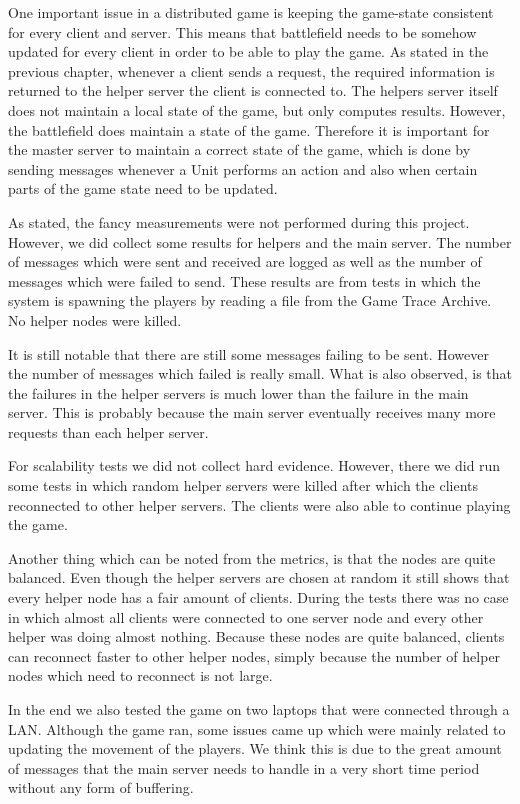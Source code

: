 One important issue in a distributed game is keeping the game-state consistent for every client and server.
This means that battlefield needs to be somehow updated for every client in order to be able to play the game.
As stated in the previous chapter, whenever a client sends a request, the required information is returned to the helper server the client is connected to.
The helpers server itself does not maintain a local state of the game, but only computes results.
However, the battlefield does maintain a state of the game. 
Therefore it is important for the master server to maintain a correct state of the game, which is done by sending messages whenever a Unit performs an action and also when certain parts of the game state need to be updated.

As stated, the fancy measurements were not performed during this project. 
However, we did collect some results for helpers and the main server.
The number of messages which were sent and received are logged as well as the number of messages which were failed to send.
These results are from tests in which the system is spawning the players by reading a file from the Game Trace Archive.
No helper nodes were killed.

It is still notable that there are still some messages failing to be sent. However the number of messages which failed is really small.
What is also observed, is that the failures in the helper servers is much lower than the failure in the main server.
This is probably because the main server eventually receives many more requests than each helper server.

For scalability tests we did not collect hard evidence. 
However, there we did run some tests in which random helper servers were killed after which the clients reconnected to other helper servers.
The clients were also able to continue playing the game.

Another thing which can be noted from the metrics, is that the nodes are quite balanced.
Even though the helper servers are chosen at random it still shows that every helper node has a fair amount of clients.
During the tests there was no case in which almost all clients were connected to one server node and every other helper was doing almost nothing.
Because these nodes are quite balanced, clients can reconnect faster to other helper nodes, simply because the number of helper nodes which need to reconnect is not large.

In the end we also tested the game on two laptops that were connected through a LAN. Although the game ran, some issues came up which were mainly related to updating the movement of the players. We think this is due to the great amount of messages that the main server needs to handle in a very short time period without any form of buffering.

